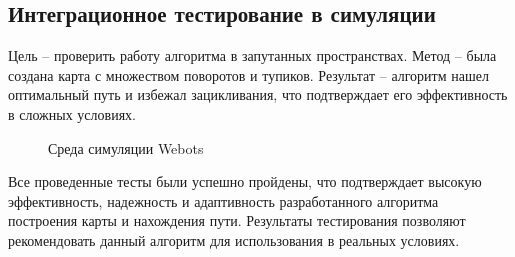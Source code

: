 \subsection{Интеграционное тестирование в симуляции}


Цель -- проверить работу алгоритма в запутанных пространствах.
Метод -- была создана карта с множеством поворотов и тупиков.
Результат -- алгоритм нашел оптимальный путь и избежал зацикливания, что
подтверждает его эффективность в сложных условиях.

\FloatBarrier
\begin{figure}[h]
\centering
\caption{Среда симуляции Webots}
\end{figure}
\FloatBarrier


Все проведенные тесты были успешно пройдены, что подтверждает высокую
эффективность, надежность и адаптивность разработанного алгоритма построения
карты и нахождения пути. Результаты тестирования позволяют рекомендовать данный
алгоритм для использования в реальных условиях.


